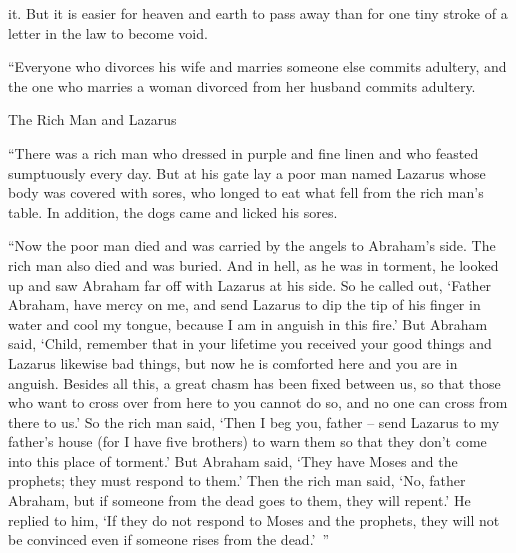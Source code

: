 {it.
But
it is
easier
for heaven
and
earth
to pass away
than
for one
tiny stroke
of a letter in the law
to become void.
\par }{\PP {}“Everyone
who divorces
his
wife
and
marries
someone else
commits adultery,
and
the one who marries
a woman divorced
from
her husband
commits adultery.
\par }{\SH The Rich Man and Lazarus
\par }{\PP {}“There
was
a rich man
who dressed in
purple
and
fine linen
and who feasted
sumptuously
every
day.
But
at
his
gate
lay a poor man
named
Lazarus
whose body was covered
with sores,
who longed
to eat
what fell
from
the rich man’s
table.
In addition,
the dogs
came
and licked
his
sores.
\par }{\PP {}“Now
the poor man
died
and
was carried
by
the angels
to
Abraham’s
side.
The rich man
also
died
and
was buried.
And
in
hell,
as he was
in
torment,
he looked up
and saw
Abraham
far off
with Lazarus
at
his
side.
So
he called out, ‘Father
Abraham,
have mercy
on me,
and
send
Lazarus
to
dip
the tip
of
his
finger
in water
and
cool
my
tongue,
because
I am in anguish
in
this
fire.’
But
Abraham
said,
‘Child,
remember
that
in
your
lifetime
you received
your
good things
and
Lazarus
likewise
bad things,
but
now
he is comforted
here
and
you
are in anguish.
Besides all
this,
a great
chasm
has been fixed
between
us,
so that
those who want
to cross over
from here
to
you
cannot
do so, and no
one can cross
from there
to
us.’
So
the rich man said,
‘Then
I beg
you,
father
– send
Lazarus
to
my
father’s
house
(for
I have
five
brothers) to
warn
them
so that
they
don’t
come
into
this
place
of torment.’
But
Abraham
said, ‘They have
Moses
and
the prophets;
they must respond
to them.’
Then
the rich man said,
‘No,
father
Abraham,
but
if
someone
from
the dead
goes
to
them,
they will repent.’
He replied
to him,
‘If
they do
not
respond
to Moses
and
the prophets,
they will
not
be convinced
even
if
someone
rises
from
the dead.’ ”

}
